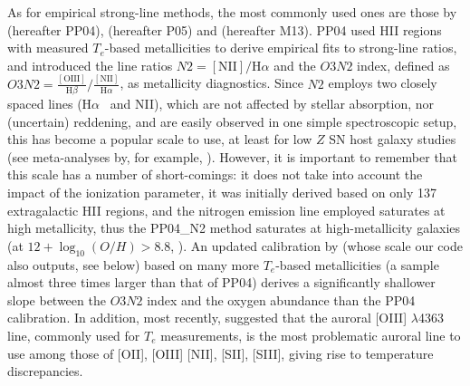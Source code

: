 \documentclass{emulateapj}
\newcommand{\oxabinline}{\ensuremath{12 + \log_{10}(O/H)}}
\newcommand{\ha}{\ensuremath{\mathrm{H}\alpha}}
\begin{document}
As for empirical strong-line methods, the most commonly used ones are those by \citet{pettini04} (hereafter PP04), \citet{pilyugin05} (hereafter P05) and \citet{marino13} (hereafter M13). PP04 used HII regions with measured $T_e$-based metallicities to derive empirical fits to strong-line ratios, and introduced the line ratios $N2=\mathrm{[NII]}/\mathrm{H}\alpha$  and the $O3N2$ index, defined as $O3N2=\frac{\mathrm{[OIII]}}{\mathrm{H}\beta} / \frac{\mathrm{[NII]}}{\mathrm{H}\alpha}$, as metallicity diagnostics. Since $N2$ employs two closely spaced lines (\ha~ and NII), which are not affected by stellar absorption, nor (uncertain) reddening, and are easily observed in one simple spectroscopic setup, this has become a popular scale to use, at least for low $Z$ SN host galaxy studies (see meta-analyses by, for example, \citealt{sanders12,modjaz12_proc,leloudas14}). However, it is important to remember that this scale has a number of short-comings: it does not take into account the impact of the ionization parameter, it was initially derived based on only 137 extragalactic HII regions, and the nitrogen emission line employed saturates at high metallicity, thus the PP04\_N2 method saturates at high-metallicity galaxies (at $\oxabinline > 8.8$, \citealt{kewley08}). An updated calibration by \citet{marino13} (whose scale our code also outputs, see below) based on many more $T_e$-based metallicities (a sample almost three times larger than that of PP04) derives a significantly shallower slope between the $O3N2$ index and the oxygen abundance than the PP04 calibration. In addition, most recently, \citet{berg15} suggested that the auroral [OIII] $\lambda$4363 line, commonly used for $T_e$ measurements, is the most problematic auroral line to use among those of [OII], [OIII] [NII], [SII], [SIII], giving rise to temperature discrepancies.
\end{document}
